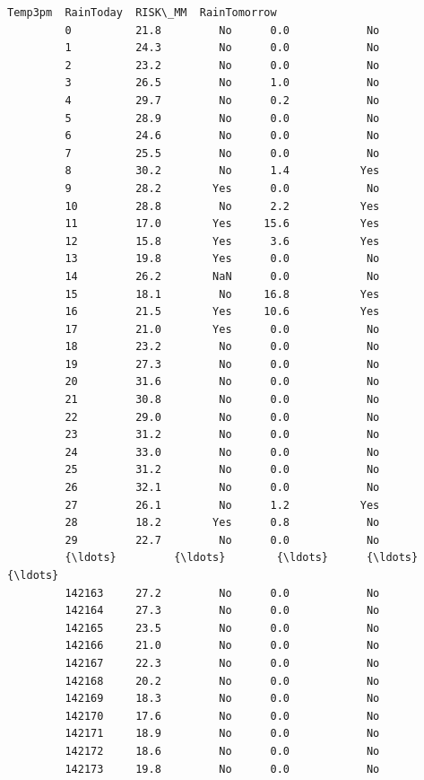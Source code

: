 \documentclass[11pt]{article}
\begin{document}
\begin{Verbatim}[commandchars=\\\{\}]
                 Temp3pm  RainToday  RISK\_MM  RainTomorrow  
         0          21.8         No      0.0            No  
         1          24.3         No      0.0            No  
         2          23.2         No      0.0            No  
         3          26.5         No      1.0            No  
         4          29.7         No      0.2            No  
         5          28.9         No      0.0            No  
         6          24.6         No      0.0            No  
         7          25.5         No      0.0            No  
         8          30.2         No      1.4           Yes  
         9          28.2        Yes      0.0            No  
         10         28.8         No      2.2           Yes  
         11         17.0        Yes     15.6           Yes  
         12         15.8        Yes      3.6           Yes  
         13         19.8        Yes      0.0            No  
         14         26.2        NaN      0.0            No  
         15         18.1         No     16.8           Yes  
         16         21.5        Yes     10.6           Yes  
         17         21.0        Yes      0.0            No  
         18         23.2         No      0.0            No  
         19         27.3         No      0.0            No  
         20         31.6         No      0.0            No  
         21         30.8         No      0.0            No  
         22         29.0         No      0.0            No  
         23         31.2         No      0.0            No  
         24         33.0         No      0.0            No  
         25         31.2         No      0.0            No  
         26         32.1         No      0.0            No  
         27         26.1         No      1.2           Yes  
         28         18.2        Yes      0.8            No  
         29         22.7         No      0.0            No  
         {\ldots}         {\ldots}        {\ldots}      {\ldots}           {\ldots}  
         142163     27.2         No      0.0            No  
         142164     27.3         No      0.0            No  
         142165     23.5         No      0.0            No  
         142166     21.0         No      0.0            No  
         142167     22.3         No      0.0            No  
         142168     20.2         No      0.0            No  
         142169     18.3         No      0.0            No  
         142170     17.6         No      0.0            No  
         142171     18.9         No      0.0            No  
         142172     18.6         No      0.0            No  
         142173     19.8         No      0.0            No  

\end{Verbatim}
\end{document}
